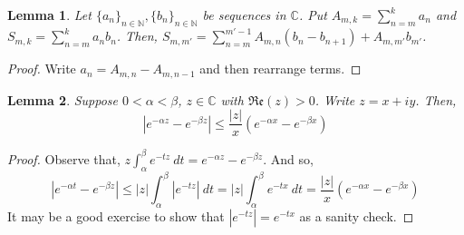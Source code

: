 \documentclass[12pt]{article}
\newcommand{\nats}{\mathbb{N}}
\newcommand{\complex}{\mathbb{C}}
\newtheorem{lemma}{Lemma}
\numberwithin{equation}{section}
\numberwithin{thm}{section}
\numberwithin{lemma}{section}
\numberwithin{cor}{section}
\begin{document}
\begin{lemma}\label{Abel}
  Let $\{a_n\}_{n \in \nats}, \{b_n\}_{n \in \nats}$ be sequences in $\complex$. Put $A_{m, k} = \sum_{n = m}^k a_n$ and $S_{m, k} = \sum_{n=m}^k a_nb_n$. Then, $S_{m, m'} = \sum_{n=m}^{m'-1} A_{m,n}(b_n - b_{n+1}) + A_{m, m'}b_{m'}$.
\end{lemma}
\begin{proof}
  Write $a_n = A_{m, n} - A_{m, n-1}$ and then rearrange terms.
\end{proof}

\begin{lemma}\label{ExponentialLemma}
  Suppose $0 < \alpha < \beta$, $z \in \complex$ with $\mathfrak{Re}(z) > 0$. Write $z = x + iy$. Then, \begin{equation*}
    \left| e^{-\alpha z} - e^{-\beta z} \right| \leq \frac{|z|}{x} \left( e^{-\alpha x} - e^{-\beta x} \right)
  \end{equation*}
\end{lemma}
\begin{proof}
  Observe that, $z \int_{\alpha}^{\beta} e^{-tz} \ dt = e^{-\alpha z} - e^{-\beta z}$. And so, \begin{equation*}
    |e^{-\alpha t} - e^{-\beta z}| \leq |z| \int_{\alpha}^{\beta} |e^{-tz}| \ dt = |z| \int_{\alpha}^{\beta} e^{-tx} \ dt = \frac{|z|}{x} (e^{-\alpha x} - e^{-\beta x})
  \end{equation*} It may be a good exercise to show that $|e^{-tz}| = e^{-tx}$ as a sanity check.
\end{proof}
\end{document}
